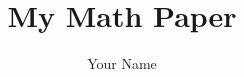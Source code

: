 \documentclass{article} %
\title{My Math Paper}
\author{Your Name}
\begin{document}
\maketitle

\begin{abstract}
\end{abstract}

\begin{flushleft}




\end{flushleft}




\end{document}
